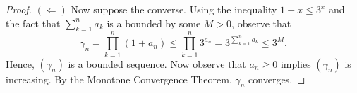 \begin{enumerate}
\begin{proof}
        \( (\Leftarrow)  \) Now suppose the converse. Using the inequality \( 1 + x \leq 3^{x} \) and the fact that \( \sum_{ k=1 }^{ n  } a_{k}  \) is a bounded by some \( M > 0  \), observe that 
        \[  \gamma_{n} = \prod_{k=1}^{n} ( 1 + a_{n}) \leq \prod_{k=1}^{n} 3^{a_{n}} = 3^{\sum_{ k=1 }^{ n } a_{k}} \leq 3^{M}.  \] Hence, \( (\gamma_{n})   \) is a bounded sequence. Now observe that \( a_{n} \geq 0  \) implies \( (\gamma_{n})  \) is increasing. By the Monotone Convergence Theorem, \( \gamma_{n} \) converges.
        \end{proof}
\end{enumerate}





